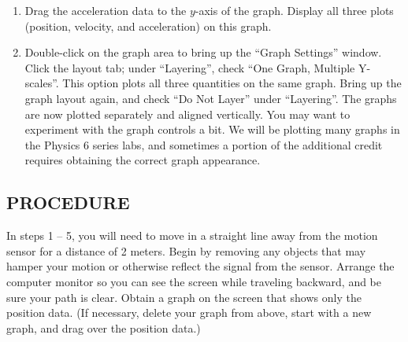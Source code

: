 \begin{enumerate}[label=\arabic*.]
\item Drag the acceleration data to the \(y\)-axis of the graph.  Display all three plots (position, velocity, and acceleration) on this graph.

\item Double-click on the graph area to bring up the ``Graph Settings'' window.  Click the layout tab; under ``Layering'', check ``One Graph, Multiple Y-scales''.  This option plots all three quantities on the same graph.  Bring up the graph layout again, and check ``Do Not Layer'' under ``Layering''.  The graphs are now plotted separately and aligned vertically.  You may want to experiment with the graph controls a bit.  We will be plotting many graphs in the Physics 6 series labs, and sometimes a portion of the additional credit requires obtaining the correct graph appearance.

\end{enumerate}

\subsection*{PROCEDURE}

In steps 1 -- 5, you will need to move in a straight line away from the motion sensor for a distance of 2 meters.  Begin by removing any objects that may hamper your motion or otherwise reflect the signal from the sensor.  Arrange the computer monitor so you can see the screen while traveling backward, and be sure your path is clear.  Obtain a graph on the screen that shows only the position data.  (If necessary, delete your graph from above, start with a new graph, and drag over the position data.)

